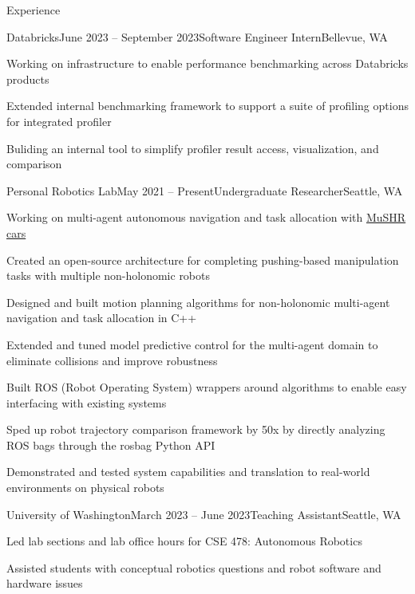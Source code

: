 \documentclass{resume} %
\begin{document}
\begin{rSection}{Experience}

\begin{rSubsection}{Databricks}{June 2023 – September 2023}{Software Engineer Intern}{Bellevue, WA}
\item Working on infrastructure to enable performance benchmarking across Databricks products
\item Extended internal benchmarking framework to support a suite of profiling options for integrated profiler
\item Buliding an internal tool to simplify profiler result access, visualization, and comparison
\end{rSubsection}

\begin{rSubsection}{Personal Robotics Lab}{May 2021 – Present}{Undergraduate Researcher}{Seattle, WA}
\item Working on multi-agent autonomous navigation and task allocation with \href{https://mushr.io}{MuSHR cars}
\item Created an open-source architecture for completing pushing-based manipulation tasks with multiple non-holonomic robots
\item Designed and built motion planning algorithms for non-holonomic multi-agent navigation and task allocation in C++
\item Extended and tuned model predictive control for the multi-agent domain to eliminate collisions and improve robustness
\item Built ROS (Robot Operating System) wrappers around algorithms to enable easy interfacing with existing systems
\item Sped up robot trajectory comparison framework by 50x by directly analyzing ROS bags through the rosbag Python API
\item Demonstrated and tested system capabilities and translation to real-world environments on physical robots
\end{rSubsection}

\begin{rSubsection}{University of Washington}{March 2023 – June 2023}{Teaching Assistant}{Seattle, WA}
\item Led lab sections and lab office hours for CSE 478: Autonomous Robotics
\item Assisted students with conceptual robotics questions and robot software and hardware issues
\end{rSubsection}


\end{rSection}
\end{document}
